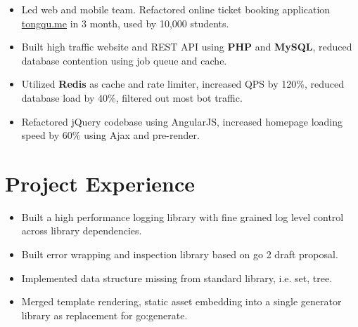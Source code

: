 \documentclass[11pt, letterpaper]{simple-cv}
\begin{document}

\begin{itemize}
	\item Led web and mobile team. Refactored online ticket booking application \href{https://tongqu.me}{tongqu.me} in 3 month, used by 10,000 students.
	\item Built high traffic website and REST API using \textbf{PHP} and \textbf{MySQL}, reduced database contention using job queue and cache.
	\item Utilized \textbf{Redis} as cache and rate limiter, increased QPS by 120\%, reduced database load by 40\%, filtered out most bot traffic.
	\item Refactored jQuery codebase using AngularJS, increased homepage loading speed by 60\% using Ajax and pre-render.
\end{itemize}

\section{Project Experience}




\begin{itemize}
	\item Built a high performance logging library with fine grained log level control across library dependencies.
	\item Built error wrapping and inspection library based on go 2 draft proposal.
	\item Implemented data structure missing from standard library, i.e. set, tree.
	\item Merged template rendering, static asset embedding into a single generator library as replacement for go:generate.
\end{itemize}
\end{document}
